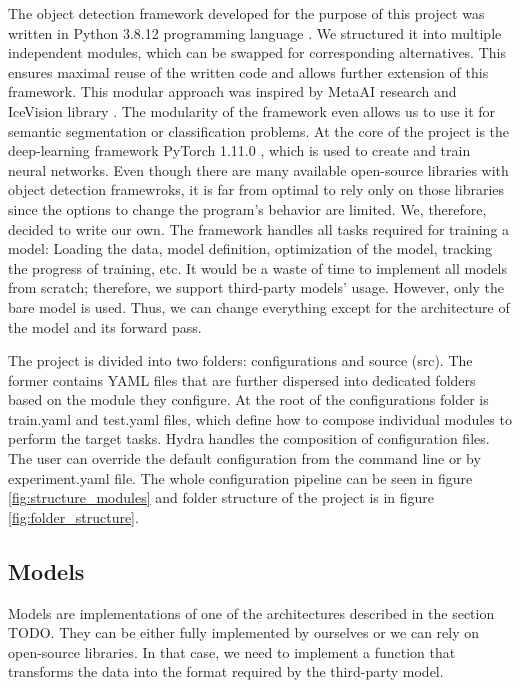 The object detection framework developed for the purpose of this project was written in Python 3.8.12 programming language \cite{Python}. We structured it into multiple independent modules, which can be swapped for corresponding alternatives. This ensures maximal reuse of the written code and allows further extension of this framework. This modular approach was inspired by MetaAI research \cite{MetaAIStatement} and IceVision library \cite{Icevision2022}. The modularity of the framework even allows us to use it for semantic segmentation or classification problems.
At the core of the project is the deep-learning framework PyTorch 1.11.0 \cite{Pytorch}, which is used to create and train neural networks. Even though there are many available open-source libraries with object detection framewroks, it is far from optimal to rely only on those libraries since the options to change the program's behavior are limited.
We, therefore, decided to write our own. The framework handles all tasks required for training a model: Loading the data, model definition, optimization of the model, tracking the progress of training, etc.  It would be a waste of time to implement all models from scratch; therefore, we support third-party models' usage. However, only the bare model is used. Thus, we can change everything except for the architecture of the model and its forward pass.

The project is divided into two folders: configurations and source (src). The former contains YAML files that are further dispersed into dedicated folders based on the module they configure. At the root of the configurations folder is train.yaml and test.yaml files, which define how to compose individual modules to perform the target tasks. Hydra \cite{Yadan2019Hydra} handles the composition of configuration files. The user can override the default configuration from the command line or by experiment.yaml file. The whole configuration pipeline can be seen in figure \ref{fig:structure_modules} and folder structure of the project is in figure \ref{fig:folder_structure}.



\subsection{Models}
Models are implementations of one of the architectures described in the section TODO. They can be either fully implemented by ourselves or we can rely on open-source libraries. In that case, we need to implement a function that transforms the data into the format required by the third-party model.

